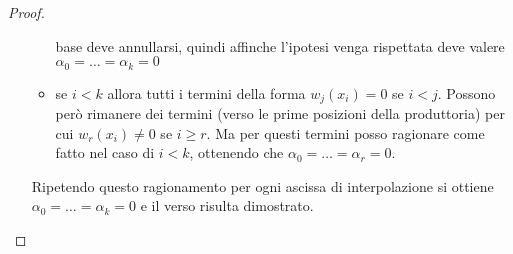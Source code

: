 \begin{proof}
\begin{enumerate}
\begin{itemize}
    base deve annullarsi, quindi affinche l'ipotesi venga rispettata deve valere 
    $\alpha_{0} = \ldots = \alpha_{k} = 0$
    \item se $i < k$ allora tutti i termini della forma $w_{j}(x_{i}) = 0$ se
    $i < j$. Possono per\`o rimanere dei termini (verso le prime posizioni
    della produttoria) per cui $w_{r}(x_{i}) \not = 0$ se
    $i \geq r$. Ma per questi termini posso ragionare come fatto nel caso di $i
    < k$, ottenendo che $\alpha_{0} = \ldots = \alpha_{r} = 0$.
  \end{itemize}
   Ripetendo questo ragionamento per ogni ascissa di interpolazione si ottiene
  $\alpha_{0} = \ldots = \alpha_{k} = 0$ e il verso risulta dimostrato.
 \end{enumerate}
\end{proof}

